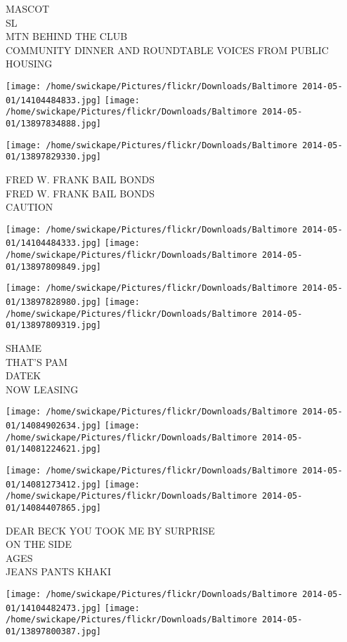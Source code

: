 \documentclass[10pt,letterpaper]{article}
\begin{document}
MASCOT\\
SL\\
MTN BEHIND THE CLUB\\
COMMUNITY DINNER AND ROUNDTABLE VOICES FROM PUBLIC HOUSING
\pagebreak

\texttt{[image: /home/swickape/Pictures/flickr/Downloads/Baltimore 2014-05-01/14104484833.jpg]}
\texttt{[image: /home/swickape/Pictures/flickr/Downloads/Baltimore 2014-05-01/13897834888.jpg]}

\vspace{0.25in}
\texttt{[image: /home/swickape/Pictures/flickr/Downloads/Baltimore 2014-05-01/13897829330.jpg]}

FRED W. FRANK BAIL BONDS\\
FRED W. FRANK BAIL BONDS\\
CAUTION
\pagebreak

\texttt{[image: /home/swickape/Pictures/flickr/Downloads/Baltimore 2014-05-01/14104484333.jpg]}
\texttt{[image: /home/swickape/Pictures/flickr/Downloads/Baltimore 2014-05-01/13897809849.jpg]}

\texttt{[image: /home/swickape/Pictures/flickr/Downloads/Baltimore 2014-05-01/13897828980.jpg]}
\texttt{[image: /home/swickape/Pictures/flickr/Downloads/Baltimore 2014-05-01/13897809319.jpg]}

SHAME\\
THAT'S PAM\\
DATEK\\
NOW LEASING
\pagebreak

\texttt{[image: /home/swickape/Pictures/flickr/Downloads/Baltimore 2014-05-01/14084902634.jpg]}
\texttt{[image: /home/swickape/Pictures/flickr/Downloads/Baltimore 2014-05-01/14081224621.jpg]}

\texttt{[image: /home/swickape/Pictures/flickr/Downloads/Baltimore 2014-05-01/14081273412.jpg]}
\texttt{[image: /home/swickape/Pictures/flickr/Downloads/Baltimore 2014-05-01/14084407865.jpg]}

DEAR BECK YOU TOOK ME BY SURPRISE\\
ON THE SIDE\\
AGES\\
JEANS PANTS KHAKI
\pagebreak

\texttt{[image: /home/swickape/Pictures/flickr/Downloads/Baltimore 2014-05-01/14104482473.jpg]}
\texttt{[image: /home/swickape/Pictures/flickr/Downloads/Baltimore 2014-05-01/13897800387.jpg]}
\end{document}
